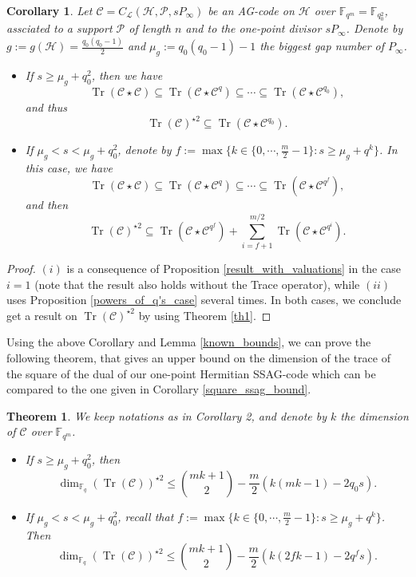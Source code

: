 \documentclass[a4paper]{article}
\newtheorem{coro1}{Corollary}
\newtheorem{thm}{Theorem}
\newcommand{\calP}{\mathcal{P}}
\newcommand{\calH}{\mathcal{H}}
\newcommand{\calL}{\mathcal{L}}
\newcommand{\calC}{\mathcal{C}}
\newcommand{\Tr}{\operatorname{Tr}}
\newcommand{\fqm}{\mathbb{F}_{q^m}}
\newcommand{\fq}{\mathbb{F}_{q}}
\begin{document}
\begin{coro1} \label{coro2}
Let $\calC = C_{\calL}(\calH,\calP,sP_{\infty})$ be an AG-code on $\calH$ over $\mathbb{F}_{q^m}=\mathbb{F}_{q_0^2}$, assciated to a support $\calP$ of length $n$ and to the one-point divisor $sP_{\infty}$. Denote by $g:=g(\calH)=\frac{q_0(q_0-1)}{2}$ and $\mu_g := q_0(q_0-1)-1$ the biggest gap number of $P_{\infty}$. 
\begin{itemize}
    \item[(i)] If $s \geq \mu_g + q_0^2$, then we have 
        \[\Tr(\calC \star \calC) \subseteq \Tr(\calC \star \calC^q) \subseteq \cdots \subseteq \Tr(\calC \star \calC^{q_0}),\]
        and thus 
        \[\Tr(\calC)^{\star 2} \subseteq \Tr(\calC \star \calC^{q_0}).\]
    \item[(ii)] If $\mu_g < s < \mu_g +q_0^2$, denote by $f:= \max\{k \in \{0,\cdots,\frac{m}{2}-1\} : s \geq \mu_g + q^k\}$. In this case, we have 
        \[\Tr(\calC \star \calC) \subseteq \Tr(\calC \star \calC^q) \subseteq \cdots \subseteq \Tr(\calC \star \calC^{q^f}),\]
          and then
        \[\Tr(\calC)^{\star 2} \subseteq \Tr(\calC \star \calC^{q^f}) + \sum\limits_{i=f+1}^{m/2} \Tr(\calC \star \calC^{q^i}).\]
\end{itemize}
\end{coro1}

\begin{proof}
$(i)$ is a consequence of Proposition \ref{result_with_valuations} in the case $i=1$ (note that the result also holds without the Trace operator), while $(ii)$ uses Proposition \ref{powers_of_q's_case} several times. In both cases, we conclude get a result on $\Tr(\calC)^{\star 2}$ by using Theorem \ref{th1}.
\end{proof}

Using the above Corollary and Lemma \ref{known_bounds}, we can prove the following theorem, that gives an upper bound on the dimension of the trace of the square of the dual of our one-point Hermitian SSAG-code which can be compared to the one given in Corollary \ref{square_ssag_bound}.

\begin{thm} \label{sup_bounds_on_codes}
We keep notations as in Corollary 2, and denote by $k$ the dimension of $\calC$ over $\fqm$.
\begin{itemize}
\item[(i)] If $s \geq \mu_g + q_0^2$, then 
\[ \dim_{\fq}(\Tr(\calC))^{\star 2} \leq \binom{mk+1}{2} - \dfrac{m}{2} (k(mk-1)-2q_0s).\]
\item[(ii)] If $\mu_g < s < \mu_g +q_0^2$, recall that $f:= \max\{k \in \{0,\cdots,\frac{m}{2}-1\} : s \geq \mu_g + q^k\}$. Then 
\[ \dim_{\fq}(\Tr(\calC))^{\star 2} \leq \binom{mk+1}{2} - \dfrac{m}{2}(k(2fk-1)-2q^fs).\]
\end{itemize}
\end{thm}
\end{document}

